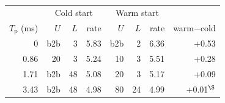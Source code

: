 \begin{tabular}{r|rrr|rrr|r}
\toprule
 & \multicolumn{3}{c|}{Cold start} & \multicolumn{3}{c|}{Warm start} & \\
$T_{\mathrm{p}}$ (ms) & $U$ & $L$ & rate & $U$ & $L$ & rate & warm$-$cold \\
\midrule
0 & b2b & 3 & 5.83 & b2b & 2 & 6.36 & +0.53 \\
0.86 & 20 & 3 & 5.24 & 10 & 3 & 5.51 & +0.28 \\
1.71 & b2b & 48 & 5.08 & 20 & 3 & 5.17 & +0.09 \\
3.43 & b2b & 48 & 4.98 & 80 & 24 & 4.99 & +0.01$^\S$ \\
\bottomrule
\end{tabular}
